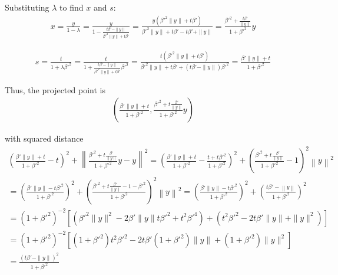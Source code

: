 \documentclass{article}
\theoremstyle{case}
\numberwithin{theorem}{subsection}
\begin{document}
Substituting $\lambda$ to find $x$ and $s$:
\begin{align*}
x = \frac {y}{1 - \lambda} 																		
= \frac {y}{1 - \frac{t{\beta'} - \|y\|}{{\beta'}^2\|y\| + t{\beta'}}} 									
= \frac {y\left({\beta'}^2\|y\| + t{\beta'}\right)}{{\beta'}^2\|y\| + t{\beta'} - t{\beta'} + \|y\|} 			
= \frac {{\beta'}^2 + \frac{t{\beta'}}{\|y\|}}{1 + {\beta'}^2}y 											
\end{align*}

\begin{align*}
s = \frac {t}{1 + \lambda{\beta'}^2 } 
= \frac {t}{1 +\frac{t{\beta'} - \|y\|}{{\beta'}^2\|y\| + t{\beta'}}{\beta'}^2 } 
= \frac {t\left({\beta'}^2\|y\| + t{\beta'}\right)}{{\beta'}^2\|y\| + t{\beta'} + \left(t{\beta'} - \|y\|\right){\beta'}^2 } 
= \frac {{\beta'}\|y\| + t}{1 + {\beta'}^2 } 
\end{align*}


Thus, the projected point is
\begin{align*}
\left(\frac{{\beta'} \|y\| + t}{1 + {\beta'} ^ 2}, \frac{{\beta'} ^ 2 + t \frac {{\beta'}}{\|y\|}}{1 + {\beta'} ^ 2}y\right)
\end{align*}

with squared distance
\begin{align*}
\left(\frac{{\beta'} \|y\| + t}{1 + {\beta'} ^ 2} - t\right)^2 + \left\|\frac{{\beta'} ^ 2 + t \frac {{\beta'}}{\|y\|}}{1 + {\beta'} ^ 2}y - y\right\|^2
= \left(\frac{{\beta'} \|y\| + t}{1 + {\beta'} ^ 2} - \frac{t + t{\beta'} ^ 2}{1 + {\beta'} ^ 2}\right)^2 + \left(\frac{{\beta'} ^ 2 + t \frac {{\beta'}}{\|y\|}}{1 + {\beta'} ^ 2} - 1\right)^2\left\|y\right\|^2 \\
= \left(\frac{{\beta'} \|y\| - t{\beta'}^2}{1 + {\beta'} ^ 2}\right)^2 + \left(\frac{{\beta'} ^ 2 + t \frac {{\beta'}}{\|y\|} - 1 - {\beta'} ^ 2}{1 + {\beta'} ^ 2}\right)^2\left\|y\right\|^2 
= \left(\frac{{\beta'} \|y\| - t{\beta'}^2}{1 + {\beta'} ^ 2}\right)^2 + \left(\frac{t {\beta'} - \left\|y\right\|}{1 + {\beta'} ^ 2}\right)^2 \\
= \left(1 + {\beta'}^2\right)^{-2}\left[\left({\beta'}^2 \|y\|^2 - 2\beta' \|y\| t {\beta'}^2  + t^2 {\beta'}^4\right) + \left(t^2{\beta'}^2 - 2 t {\beta'} \|y\| + \|y\|^2\right) \right] \\
= \left(1 + {\beta'}^2\right)^{-2}\left[
\left(1 + {\beta'}^2\right)t^2{\beta'}^2 - 2t{\beta'}\left(1 + {\beta'}^2\right) \|y\| + \left(1 + {\beta'}^2\right)\|y\|^2
\right] \\
= \frac{\left(t \beta' - \|y\|\right)^2}{1 + {\beta'}^2}
\end{align*}
\end{document}
